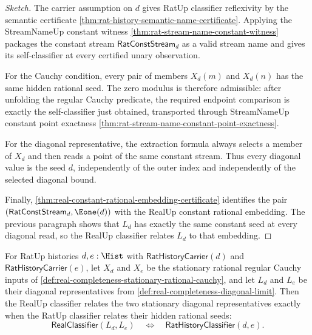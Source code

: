 \begin{proof}[Sketch]
The carrier assumption on $d$ gives RatUp classifier reflexivity by the semantic certificate \autoref{thm:rat-history-semantic-name-certificate}. Applying the StreamNameUp constant witness \autoref{thm:rat-stream-name-constant-witness} packages the constant stream $\mathsf{RatConstStream}_d$ as a valid stream name and gives its self-classifier at every certified unary observation.

For the Cauchy condition, every pair of members $X_d(m)$ and $X_d(n)$ has the same hidden rational seed. The zero modulus is therefore admissible: after unfolding the regular Cauchy predicate, the required endpoint comparison is exactly the self-classifier just obtained, transported through StreamNameUp constant point exactness \autoref{thm:rat-stream-name-constant-point-exactness}.

For the diagonal representative, the extraction formula always selects a member of $X_d$ and then reads a point of the same constant stream. Thus every diagonal value is the seed $d$, independently of the outer index and independently of the selected diagonal bound.

Finally, \autoref{thm:real-constant-rational-embedding-certificate} identifies the pair $(\mathsf{RatConstStream}_d,\Eone(d))$ with the RealUp constant rational embedding. The previous paragraph shows that $L_d$ has exactly the same constant seed at every diagonal read, so the RealUp classifier relates $L_d$ to that embedding.
\end{proof}

\begin{theorem}
\label{thm:real-completeness-stationary-embedding-classifier-full-correspondence}
For RatUp histories $d,e:\Hist$ with $\mathsf{RatHistoryCarrier}(d)$ and
$\mathsf{RatHistoryCarrier}(e)$, let $X_d$ and $X_e$ be the stationary rational
regular Cauchy inputs of
\autoref{def:real-completeness-stationary-rational-cauchy}, and let $L_d$ and
$L_e$ be their diagonal representatives from
\autoref{def:real-completeness-diagonal-limit}. Then the RealUp classifier
relates the two stationary diagonal representatives exactly when the RatUp
classifier relates their hidden rational seeds:
$$
\mathsf{RealClassifier}(L_d,L_e)
\quad\Longleftrightarrow\quad
\mathsf{RatHistoryClassifier}(d,e).
$$
\end{theorem}

